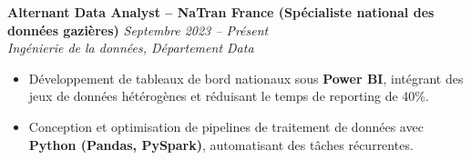 \textbf{Alternant Data Analyst – NaTran France (Spécialiste national des données gazières)} \hfill \textit{Septembre 2023 – Présent}\\
\textit{Ingénierie de la données, Département Data}
\begin{itemize}
    \item Développement de tableaux de bord nationaux sous \textbf{Power BI}, intégrant des jeux de données hétérogènes et réduisant le temps de reporting de 40\%.
    \item Conception et optimisation de pipelines de traitement de données avec \textbf{Python (Pandas, PySpark)}, automatisant des tâches récurrentes.
\end{itemize}

